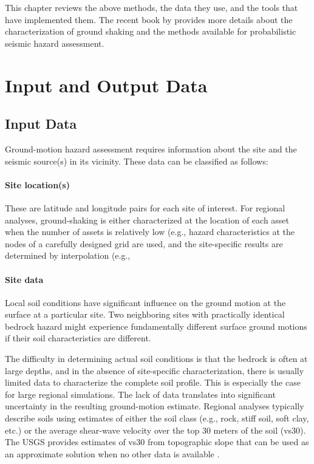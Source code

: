 This chapter reviews the above methods, the data they use, and the tools that have implemented them. The recent book by \cite{baker2021seismic} provides more details about the characterization of ground shaking and the methods available for probabilistic seismic hazard assessment. 

\section{Input and Output Data}
\label{sec:eq_shake_io}

\subsection{Input Data}

Ground-motion hazard assessment requires information about the site and the seismic source(s) in its vicinity. These data can be classified as follows:

\paragraph{Site location(s)} These are latitude and longitude pairs for each site of interest. For regional analyses, ground-shaking is either characterized at the location of each asset when the number of assets is relatively low (e.g.,  hazard characteristics at the nodes of a carefully designed grid are used, and the site-specific results are determined by interpolation (e.g., 

\paragraph{Site data} Local soil conditions have significant influence on the ground motion at the surface at a particular site. Two neighboring sites with practically identical bedrock hazard might experience fundamentally different surface ground motions if their soil characteristics are different. 

The difficulty in determining actual soil conditions is that the bedrock is often at large depths, and in the absence of site-specific characterization, there is usually limited data to characterize the complete soil profile. This is especially the case for large regional simulations. The lack of data translates into significant uncertainty in the resulting ground-motion estimate. Regional analyses typically describe soils using estimates of either the soil class (e.g., rock, stiff soil, soft clay, etc.) or the average shear-wave velocity over the top 30 meters of the soil (vs30). The USGS provides estimates of vs30 from topographic slope that can be used as an approximate solution when no other data is available \citep{usgs2020vs30}. 

